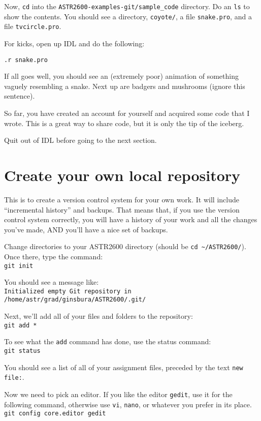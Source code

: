 \documentclass{article}
\begin{document}
\begin{spacing}{1.0}
Now, \texttt{cd} into the \verb|ASTR2600-examples-git/sample_code| directory.  Do an
\verb|ls| to show the contents.  You should see a directory, \texttt{coyote/},
a file \texttt{snake.pro}, and a file \texttt{tvcircle.pro}.

For kicks, open up IDL and do the following:

\verb|.r snake.pro|

If all goes well, you should see an (extremely poor) animation of something vaguely
resembling a snake.  Next up are badgers and mushrooms (ignore this sentence).

So far, you have created an account for yourself and acquired some code that I wrote.
This is a great way to share code, but it is only the tip of the iceberg.

Quit out of IDL before going to the next section.

\section{Create your own local repository}

This is to create a version control system for your own work.  It will include “incremental
history” and backups.  That means that, if you use the version control system correctly,
you will have a history of your work and all the changes you've made, AND you'll have a nice
set of backups.

Change directories to your ASTR2600 directory (should be \verb|cd ~/ASTR2600/|).
Once there, type the command:\\
\verb|git init|

You should see a message like:\\
\verb|Initialized empty Git repository in /home/astr/grad/ginsbura/ASTR2600/.git/|

Next, we'll add all of your files and folders to the repository:\\
\verb|git add *|

To see what the \texttt{add} command has done, use the status command:\\
\verb|git status|

You should see a list of all of your assignment files, preceded by the text \verb|new file:|.

Now we need to pick an editor.  If you like the editor \verb|gedit|, use it for
the following command, otherwise use \verb|vi|, \verb|nano|, or whatever you
prefer in its place.\\
\verb|git config core.editor gedit|


\end{spacing}
\end{document}
